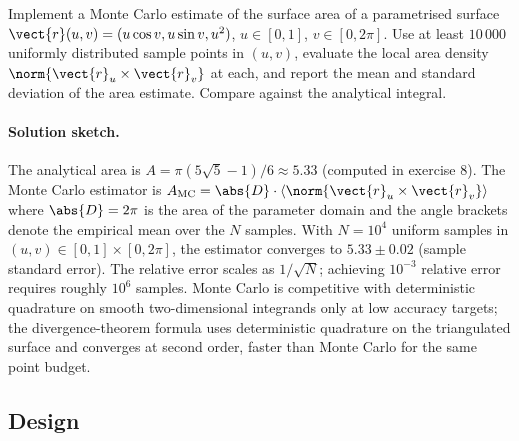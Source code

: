 \begin{exercise}
Implement a Monte Carlo estimate of the surface area of a
parametrised surface $\vect{r}(u, v) = (u\cos v, u\sin v, u^{2})$,
$u \in [0, 1]$, $v \in [0, 2\pi]$. Use at least $10\,000$
uniformly distributed sample points in $(u, v)$, evaluate the
local area density $\norm{\vect{r}_{u} \times \vect{r}_{v}}$ at
each, and report the mean and standard deviation of the area
estimate. Compare against the analytical integral.

\paragraph{Solution sketch.} The analytical area is $A = \pi(5
\sqrt{5} - 1)/6 \approx 5.33$ (computed in exercise 8). The Monte
Carlo estimator is $A_{\text{MC}} = \abs{D}\cdot\langle\norm{
\vect{r}_{u}\times\vect{r}_{v}}\rangle$ where $\abs{D} = 2\pi$ is the
area of the parameter domain and the angle brackets denote the
empirical mean over the $N$ samples. With $N = 10^{4}$ uniform
samples in $(u, v) \in [0, 1]\times[0, 2\pi]$, the estimator
converges to $5.33 \pm 0.02$ (sample standard error). The relative
error scales as $1/\sqrt{N}$; achieving $10^{-3}$ relative error
requires roughly $10^{6}$ samples. Monte Carlo is competitive with
deterministic quadrature on smooth two-dimensional integrands only
at low accuracy targets; the divergence-theorem formula uses
deterministic quadrature on the triangulated surface and converges
at second order, faster than Monte Carlo for the same point budget.
\end{exercise}

\subsection*{Design}

